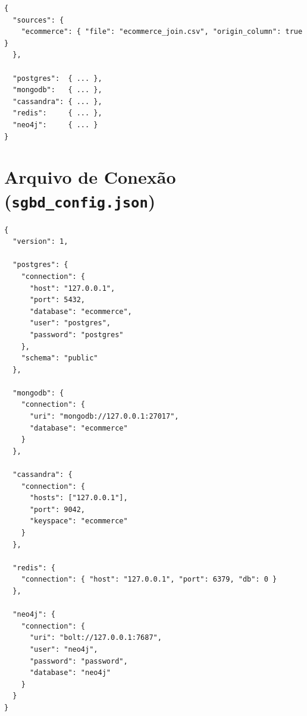 \begin{lstlisting}[style=jsonstyle,caption={Bloco \texttt{sources} do arquivo de importação no modo combinado (\texttt{import\_config\_combined.json}).},label={lst:import-combined-sources}]
{
  "sources": {
    "ecommerce": { "file": "ecommerce_join.csv", "origin_column": true }
  },

  "postgres":  { ... },
  "mongodb":   { ... },
  "cassandra": { ... },
  "redis":     { ... },
  "neo4j":     { ... }
}
\end{lstlisting}

\section{Arquivo de Conexão (\texttt{sgbd\_config.json})}

\begin{lstlisting}[style=jsonstyle,caption={Arquivo de conexão completo do cenário e-commerce (\texttt{sgbd\_config.json}).},label={lst:sgbd-config-full}]
{
  "version": 1,

  "postgres": {
    "connection": {
      "host": "127.0.0.1",
      "port": 5432,
      "database": "ecommerce",
      "user": "postgres",
      "password": "postgres"
    },
    "schema": "public"
  },

  "mongodb": {
    "connection": {
      "uri": "mongodb://127.0.0.1:27017",
      "database": "ecommerce"
    }
  },

  "cassandra": {
    "connection": {
      "hosts": ["127.0.0.1"],
      "port": 9042,
      "keyspace": "ecommerce"
    }
  },

  "redis": {
    "connection": { "host": "127.0.0.1", "port": 6379, "db": 0 }
  },

  "neo4j": {
    "connection": {
      "uri": "bolt://127.0.0.1:7687",
      "user": "neo4j",
      "password": "password",
      "database": "neo4j"
    }
  }
}
\end{lstlisting}
